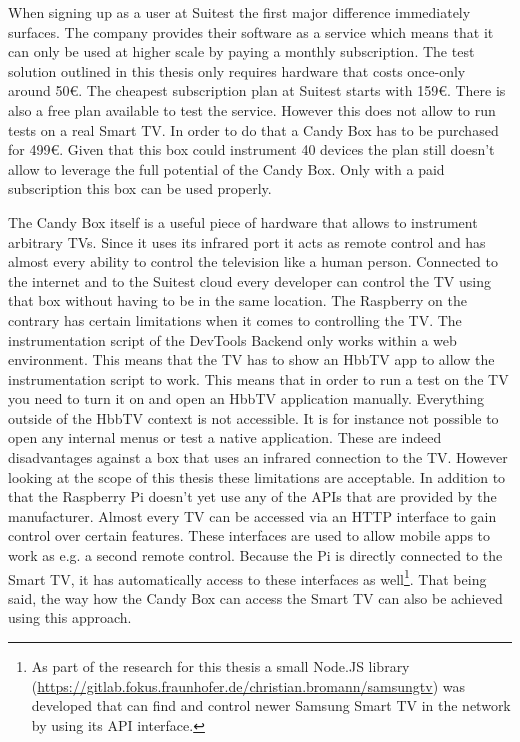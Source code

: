 When signing up as a user at Suitest the first major difference immediately surfaces. The company provides their software as a service which means that it can only be used at higher scale by paying a monthly subscription. The test solution outlined in this thesis only requires hardware that costs once-only around 50\euro. The cheapest subscription plan at Suitest starts with 159\euro. There is also a free plan available to test the service. However this does not allow to run tests on a real Smart TV. In order to do that a Candy Box has to be purchased for 499\euro. Given that this box could instrument 40 devices the plan still doesn't allow to leverage the full potential of the Candy Box. Only with a paid subscription this box can be used properly.

The Candy Box itself is a useful piece of hardware that allows to instrument arbitrary TVs. Since it uses its infrared port it acts as remote control and has almost every ability to control the television like a human person. Connected to the internet and to the Suitest cloud every developer can control the TV using that box without having to be in the same location. The Raspberry on the contrary has certain limitations when it comes to controlling the TV. The instrumentation script of the DevTools Backend only works within a web environment. This means that the TV has to show an HbbTV app to allow the instrumentation script to work. This means that in order to run a test on the TV you need to turn it on and open an HbbTV application manually. Everything outside of the HbbTV context is not accessible. It is for instance not possible to open any internal menus or test a native application. These are indeed disadvantages against a box that uses an infrared connection to the TV. However looking at the scope of this thesis these limitations are acceptable. In addition to that the Raspberry Pi doesn't yet use any of the APIs that are provided by the manufacturer. Almost every TV can be accessed via an HTTP interface to gain control over certain features. These interfaces are used to allow mobile apps to work as e.g. a second remote control. Because the Pi is directly connected to the Smart TV, it has automatically access to these interfaces as well\footnote{As part of the research for this thesis a small Node.JS library (\url{https://gitlab.fokus.fraunhofer.de/christian.bromann/samsungtv}) was developed that can find and control newer Samsung Smart TV in the network by using its API interface.}. That being said, the way how the Candy Box can access the Smart TV can also be achieved using this approach.


